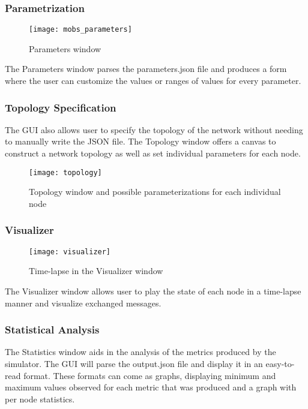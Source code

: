 \subsubsection{Parametrization}\label{subsubsec:parametrization}

\begin{figure}[h]
	\centering
	\texttt{[image: mobs\_parameters]}
	\caption{Parameters window}
	\label{fig:mobs_parameters}
\end{figure}

The Parameters window parses the parameters.json file and produces a form
where the user can customize the values or ranges of values for every parameter.

\subsubsection{Topology Specification}\label{subsubsec:topology_specification}

The GUI also allows user to specify the topology of the network without needing
to manually write the JSON file. The Topology window offers a canvas to construct a network
topology as well as set individual parameters for each node.

\begin{figure}[h]
	\centering
	\texttt{[image: topology]}
	\caption{Topology window and possible parameterizations for each individual node}
	\label{fig:topology}
\end{figure}

\subsubsection{Visualizer}\label{subsubsec:visualizer}

\begin{figure}[h]
	\centering
	\texttt{[image: visualizer]}
	\caption{Time-lapse in the Visualizer window}
	\label{fig:visualizer}
\end{figure}

The Visualizer window allows user to play the state of each node in a time-lapse manner
and visualize exchanged messages.

\subsubsection{Statistical Analysis}\label{subsubsec:statistical_analysis}

The Statistics window aids in the analysis of the metrics produced by the simulator.
The GUI will parse the output.json file and display it in an easy-to-read format.
These formats can come as graphs, displaying minimum and maximum values observed
for each metric that was produced and a graph with per node statistics.

